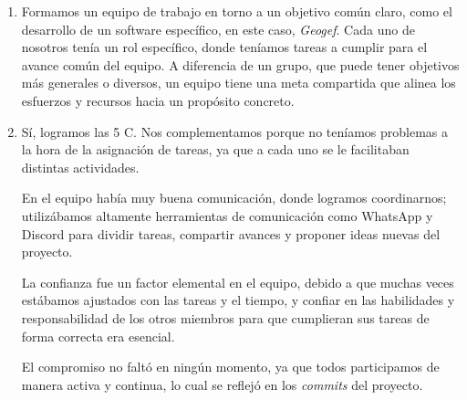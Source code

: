 \documentclass{article}
\begin{document}
\begin{enumerate}
    \item
    Formamos un equipo de trabajo en torno a un objetivo común claro, como el desarrollo de un software específico, en este caso, \textit{Geogef}. Cada uno de nosotros tenía un rol específico, donde teníamos tareas a cumplir para el avance común del equipo. A diferencia de un grupo, que puede tener objetivos más generales o diversos, un equipo tiene una meta compartida que alinea los esfuerzos y recursos hacia un propósito concreto.

    \item
    Sí, logramos las 5 C. Nos complementamos porque no teníamos problemas a la hora de la asignación de tareas, ya que a cada uno se le facilitaban distintas actividades.

    En el equipo había muy buena comunicación, donde logramos coordinarnos; utilizábamos altamente herramientas de comunicación como WhatsApp y Discord para dividir tareas, compartir avances y proponer ideas nuevas del proyecto.

    La confianza fue un factor elemental en el equipo, debido a que muchas veces estábamos ajustados con las tareas y el tiempo, y confiar en las habilidades y responsabilidad de los otros miembros para que cumplieran sus tareas de forma correcta era esencial.

    El compromiso no faltó en ningún momento, ya que todos participamos de manera activa y continua, lo cual se reflejó en los \textit{commits} del proyecto.

\end{enumerate}
\end{document}
